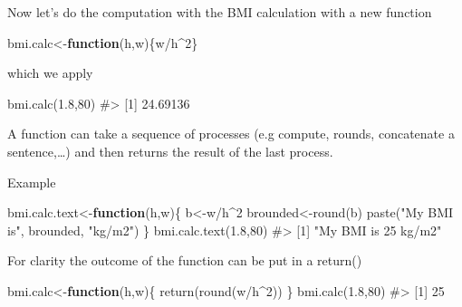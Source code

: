 \documentclass[
  letterpaper,
  DIV=11,
  numbers=noendperiod]{scrreprt}
\newenvironment{Shaded}{\begin{snugshade}}{\end{snugshade}}
\newcommand{\CommentTok}[1]{\textcolor[rgb]{0.37,0.37,0.37}{#1}}
\newcommand{\ControlFlowTok}[1]{\textcolor[rgb]{0.00,0.23,0.31}{\textbf{#1}}}
\newcommand{\DecValTok}[1]{\textcolor[rgb]{0.68,0.00,0.00}{#1}}
\newcommand{\FloatTok}[1]{\textcolor[rgb]{0.68,0.00,0.00}{#1}}
\newcommand{\FunctionTok}[1]{\textcolor[rgb]{0.28,0.35,0.67}{#1}}
\newcommand{\NormalTok}[1]{\textcolor[rgb]{0.00,0.23,0.31}{#1}}
\newcommand{\OtherTok}[1]{\textcolor[rgb]{0.00,0.23,0.31}{#1}}
\newcommand{\SpecialCharTok}[1]{\textcolor[rgb]{0.37,0.37,0.37}{#1}}
\newcommand{\StringTok}[1]{\textcolor[rgb]{0.13,0.47,0.30}{#1}}
\begin{document}
Now let's do the computation with the BMI calculation with a new
function

\begin{Shaded}
\begin{Highlighting}[]
\NormalTok{bmi.calc}\OtherTok{\textless{}{-}}\ControlFlowTok{function}\NormalTok{(h,w)\{w}\SpecialCharTok{/}\NormalTok{h}\SpecialCharTok{\^{}}\DecValTok{2}\NormalTok{\}}
\end{Highlighting}
\end{Shaded}

which we apply

\begin{Shaded}
\begin{Highlighting}[]
\FunctionTok{bmi.calc}\NormalTok{(}\FloatTok{1.8}\NormalTok{,}\DecValTok{80}\NormalTok{)}
\CommentTok{\#\textgreater{} [1] 24.69136}
\end{Highlighting}
\end{Shaded}

A function can take a sequence of processes (e.g compute, rounds,
concatenate a sentence,\ldots) and then returns the result of the last
process.

Example

\begin{Shaded}
\begin{Highlighting}[]
\NormalTok{bmi.calc.text}\OtherTok{\textless{}{-}}\ControlFlowTok{function}\NormalTok{(h,w)\{}
\NormalTok{  b}\OtherTok{\textless{}{-}}\NormalTok{w}\SpecialCharTok{/}\NormalTok{h}\SpecialCharTok{\^{}}\DecValTok{2}
\NormalTok{  brounded}\OtherTok{\textless{}{-}}\FunctionTok{round}\NormalTok{(b)}
  \FunctionTok{paste}\NormalTok{(}\StringTok{"My BMI is"}\NormalTok{, brounded, }\StringTok{"kg/m2"}\NormalTok{)}
\NormalTok{\}}
\FunctionTok{bmi.calc.text}\NormalTok{(}\FloatTok{1.8}\NormalTok{,}\DecValTok{80}\NormalTok{)}
\CommentTok{\#\textgreater{} [1] "My BMI is 25 kg/m2"}
\end{Highlighting}
\end{Shaded}

For clarity the outcome of the function can be put in a return()

\begin{Shaded}
\begin{Highlighting}[]
\NormalTok{bmi.calc}\OtherTok{\textless{}{-}}\ControlFlowTok{function}\NormalTok{(h,w)\{}
  \FunctionTok{return}\NormalTok{(}\FunctionTok{round}\NormalTok{(w}\SpecialCharTok{/}\NormalTok{h}\SpecialCharTok{\^{}}\DecValTok{2}\NormalTok{))}
\NormalTok{\}}
\FunctionTok{bmi.calc}\NormalTok{(}\FloatTok{1.8}\NormalTok{,}\DecValTok{80}\NormalTok{)}
\CommentTok{\#\textgreater{} [1] 25}
\end{Highlighting}
\end{Shaded}
\end{document}
